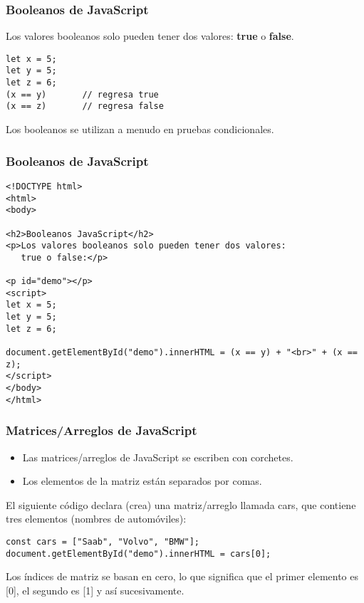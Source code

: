 \begin{frame}[fragile]
  \frametitle{Booleanos de JavaScript}

  Los valores booleanos solo pueden tener dos valores:
  \textbf{true} o \textbf{false}.

  \vspace{\baselineskip}
  \begin{lstlisting}
let x = 5;
let y = 5;
let z = 6;
(x == y)       // regresa true
(x == z)       // regresa false 
  \end{lstlisting}

  Los booleanos se utilizan a menudo en pruebas condicionales.
\end{frame}

\begin{frame}[fragile]
  \frametitle{Booleanos de JavaScript}
  \begin{lstlisting}
<!DOCTYPE html>
<html>
<body>

<h2>Booleanos JavaScript</h2>
<p>Los valores booleanos solo pueden tener dos valores:
   true o false:</p>

<p id="demo"></p>
<script>
let x = 5;
let y = 5;
let z = 6;

document.getElementById("demo").innerHTML = (x == y) + "<br>" + (x == z);
</script>
</body>
</html>
  \end{lstlisting}
\end{frame}

\begin{frame}[fragile]
  \frametitle{Matrices/Arreglos de JavaScript}

  \begin{itemize}
    \item Las matrices/arreglos de JavaScript se escriben con corchetes.
    \item Los elementos de la matriz están separados por comas.
  \end{itemize}

  \vspace{\baselineskip}
  El siguiente código declara (crea) una matriz/arreglo llamada cars,
  que contiene tres elementos (nombres de automóviles):
  \begin{lstlisting}
const cars = ["Saab", "Volvo", "BMW"];
document.getElementById("demo").innerHTML = cars[0];
  \end{lstlisting}

  \vspace{\baselineskip}
  Los índices de matriz se basan en cero, lo que significa que el
  primer elemento es [0], el segundo es [1] y así sucesivamente.
\end{frame}

